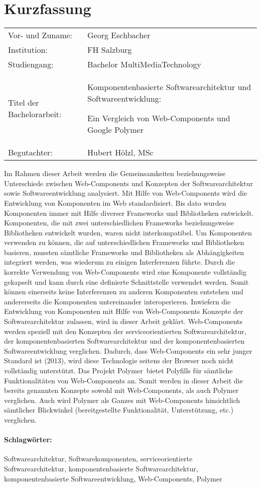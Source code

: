 \section*{Kurzfassung}
\begin{tabular}{p{4cm} p{12cm}}
Vor- und Zuname:& Georg Eschbacher\\
Institution: & FH Salzburg\\
Studiengang: &  Bachelor MultiMediaTechnology\\
Titel der Bachelorarbeit: & Komponentenbasierte Softwarearchitektur und Softwareentwicklung: \par Ein Vergleich von Web-Components und Google Polymer\\
Begutachter: & Hubert Hölzl, MSc\\
\end{tabular}
\vspace{0.5cm}

Im Rahmen dieser Arbeit werden die Gemeinsamkeiten beziehungsweise Unterschiede zwischen Web-Components und Konzepten der Softwarearchitektur sowie Softwareentwicklung analysiert. Mit Hilfe von Web-Components wird die Entwicklung von Komponenten im Web standardisiert. Bis dato wurden Komponenten immer mit Hilfe diverser Frameworks und Bibliotheken entwickelt. Komponenten, die mit zwei unterschiedlichen Frameworks beziehungsweise Bibliotheken entwickelt wurden, waren nicht interkompatibel. Um Komponenten verwenden zu können, die auf unterschiedlichen Frameworks und Bibliotheken basieren,  mussten sämtliche Frameworks und Bibliotheken als Abhängigkeiten integriert werden, was wiederum zu einigen Interferenzen führte. Durch die korrekte Verwendung von Web-Components wird eine Komponente vollständig gekapselt und kann durch eine definierte Schnittstelle verwendet werden. Somit können einerseits keine Interferenzen zu anderen Komponenten entstehen und andererseits die Komponenten untereinander interoperieren. Inwiefern die Entwicklung von Komponenten mit Hilfe von Web-Components Konzepte der Softwarearchitektur zulassen, wird in dieser Arbeit geklärt. Web-Components werden speziell mit den Konzepten der serviceorientierten Softwarearchitektur, der komponentenbasierten Softwarearchitektur und der komponentenbasierten Softwareentwicklung verglichen. Dadurch, dass Web-Components ein sehr junger Standard ist (2013), wird diese Technologie seitens der Browser noch nicht vollständig unterstützt. Das Projekt \glqq Polymer\grqq\ bietet Polyfills für sämtliche Funktionalitäten von Web-Components an. Somit werden in dieser Arbeit die bereits genannten Konzepte sowohl mit Web-Components, als auch Polymer verglichen. Auch wird Polymer als Ganzes mit Web-Components hinsichtlich sämtlicher Blickwinkel (bereitgestellte Funktionalität, Unterstützung, etc.) verglichen.

\paragraph{Schlagwörter:}
Softwarearchitektur, Softwarekomponenten, serviceorientierte Softwarearchitektur, komponentenbasierte Softwarearchitektur, komponentenbasierte Softwareentwicklung, Web-Components, Polymer
